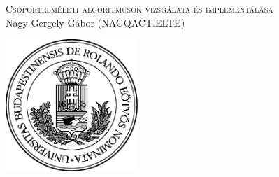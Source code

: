\begin{center}

\textsc{Csoportelméleti algoritmusok vizsgálata és implementálása}\\[1.5cm]
Nagy Gergely Gábor (NAGQACT.ELTE)\\[5cm]

\vspace{10cm}

\includegraphics[width=5cm]{elte_cimer_ff}

\end{center}

\thispagestyle{empty}
\clearpage
